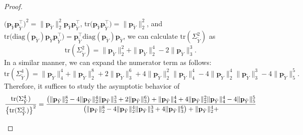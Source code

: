 \documentclass[twoside,11pt]{article}
\newcommand{\rvTwo}{Y}
\newcommand{\probVec}{\mathbf{p}} %
\begin{document}
\begin{appendix}
\begin{proof}
\begin{itemize}
			$\bigl(\probVec_{\tilde{\rvTwo}} \probVec_{\tilde{\rvTwo}}^\top\bigr)^2 = \|\probVec_{\tilde{\rvTwo}}\|_2^2 \probVec_{\tilde{\rvTwo}} \probVec_{\tilde{\rvTwo}}^\top$,
			$
			\mathrm{tr}
			\bigl(
			\probVec_{\tilde{\rvTwo}} \probVec_{\tilde{\rvTwo}}^\top
			\bigr) = \|
			\probVec_{\tilde{\rvTwo}}\|_2^2$,
			and
			$\mathrm{tr}\bigl(\text{diag}(\probVec_{\tilde{\rvTwo}})\probVec_{\tilde{\rvTwo}} \probVec_{\tilde{\rvTwo}}^\top\bigr)
			=
			\probVec_{\tilde{\rvTwo}}^\top \text{diag}(\probVec_{\tilde{\rvTwo}}) \probVec_{\tilde{\rvTwo}}
			$,
			we can calculate $\mathrm{tr}(\Sigma_{\tilde{\rvTwo}}^2)$ as
			\begin{equation*}
				\mathrm{tr}(\Sigma_{\tilde{\rvTwo}}^2)
				=
				\|\probVec_{\tilde{\rvTwo}}\|_2^2
				+
				\|
				\probVec_{\tilde{\rvTwo}}
				\|_2^4
				-
				2
				\|\probVec_{\tilde{\rvTwo}}\|_3^3.
			\end{equation*}
			In a similar manner, we can expand the numerator term as follows:
			\begin{equation*}
				\mathrm{tr}(\Sigma_{\tilde{Y}}^4)
				=
				\|\mathbf{p}_{\tilde{Y}}\|_4^4 + \|\mathbf{p}_{\tilde{Y}}\|_2^8 + 2\|\mathbf{p}_{\tilde{Y}}\|_3^6
				+
				4\|\mathbf{p}_{\tilde{Y}}\|_2^2 \|\mathbf{p}_{\tilde{Y}}\|_4^4
				- 4\|\mathbf{p}_{\tilde{Y}}\|_2^4\|\mathbf{p}_{\tilde{Y}}\|_3^3 - 4\|\mathbf{p}_{\tilde{Y}}\|_5^5.
			\end{equation*}
			Therefore, it suffices to study the asymptotic behavior of
			\begin{equation}\label{trace_ratio_norm_expression}
				\frac{
					\mathrm{tr}(\Sigma_{\tilde{\rvTwo}}^4)
				}{
					\bigl\{
					\mathrm{tr}(\Sigma_{\tilde{\rvTwo}}^2)
					\bigr\}^2   
				}
				=
				\frac{
					\bigl(
					\|\mathbf{p}_{\tilde{{Y}}}\|_2^8
					- 4\|\mathbf{p}_{\tilde{{Y}}}\|_2^4\|\mathbf{p}_{\tilde{{Y}}}\|_3^3
					+ 2\|\mathbf{p}_{\tilde{{Y}}}\|_3^6
					\bigr)
					+
					\|\mathbf{p}_{\tilde{{Y}}}\|_4^4
					+
					4\|\mathbf{p}_{\tilde{{Y}}}\|_2^2 \|\mathbf{p}_{\tilde{{Y}}}\|_4^4
					- 4\|\mathbf{p}_{\tilde{{Y}}}\|_5^5
				}{
					\bigl(
					\|
					\probVec_{\tilde{\rvTwo}}
					\|_2^8
					-
					4
					\|
					\probVec_{\tilde{\rvTwo}}
					\|_2^4
					\|\probVec_{\tilde{\rvTwo}}\|_3^3
					+
					4
					\|\probVec_{\tilde{\rvTwo}}\|_3^6
					\bigr)
					+
					\|\probVec_{\tilde{\rvTwo}}\|_2^4
					+
}
\end{equation}
\end{itemize}
\end{proof}
\end{appendix}
\end{document}
